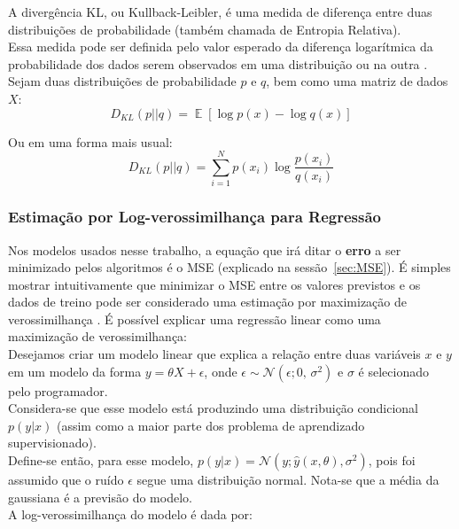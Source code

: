 A divergência KL, ou Kullback-Leibler, é uma medida de diferença entre duas distribuições de probabilidade (também chamada de Entropia Relativa). \\
Essa medida pode ser definida pelo valor esperado da diferença logarítmica da probabilidade dos dados serem observados em uma distribuição ou na outra \citep{dlbook}. \\
Sejam duas distribuições de probabilidade $p$ e $q$, bem como uma matriz de dados $X$: \\

\[D_{KL}(p || q) = \mathop{\mathbb{E}}[\log p(x) - \log q(x)]​\]

Ou em uma forma mais usual: \\

\[D_{KL}(p||q) = \sum_{i=1}^{N}p(x_{i}) \log \frac{p(x_{i})}{q(x_{i})}​\]


\subsubsection{Estimação por Log-verossimilhança para Regressão}
\label{sec:reglog}
Nos modelos usados nesse trabalho, a equação que irá ditar o \textbf{erro} a ser
minimizado pelos algoritmos é o MSE (explicado na sessão~\ref{sec:MSE}). 
É simples mostrar intuitivamente que minimizar o MSE entre os valores previstos
e os dados de treino pode ser considerado uma estimação por maximização de
verossimilhança \citep{dlbook}. É possível explicar uma regressão linear como
uma maximização de verossimilhança:
\\

Desejamos criar um modelo linear que explica a relação entre duas variáveis
$x$ e $y$ em um modelo da forma $y = \theta X + \epsilon$, onde $\epsilon
\sim \mathcal{N}(\epsilon;0,\,\sigma^2)$ e $\sigma$ é selecionado pelo programador.\\

Considera-se que esse modelo está produzindo uma distribuição condicional
$p(y|x)$ (assim como a maior parte dos problema de aprendizado supervisionado). \\ 

Define-se então, para esse modelo, $p(y|x) =
\mathcal{N}(y ; \hat{y}(x,\theta),\sigma^2)$, pois foi assumido que o ruído $\epsilon$
segue uma distribuição normal. Nota-se que a média da gaussiana é a previsão do
modelo. \\

A log-verossimilhança do modelo é dada por: \\

